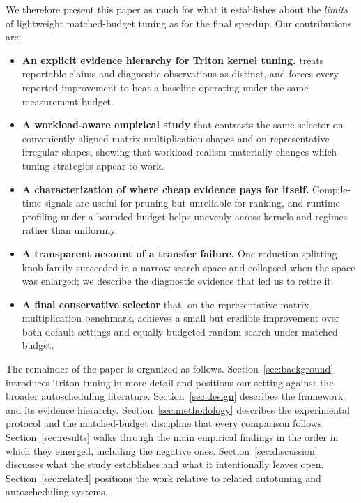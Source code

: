 We therefore present this paper as much for what it establishes about the \emph{limits} of lightweight matched-budget tuning as for the final speedup. Our contributions are:
\begin{itemize}
\item \textbf{An explicit evidence hierarchy for Triton kernel tuning.} \system treats reportable claims and diagnostic observations as distinct, and forces every reported improvement to beat a baseline operating under the same measurement budget.
\item \textbf{A workload-aware empirical study} that contrasts the same selector on conveniently aligned matrix multiplication shapes and on representative irregular shapes, showing that workload realism materially changes which tuning strategies appear to work.
\item \textbf{A characterization of where cheap evidence pays for itself.} Compile-time signals are useful for pruning but unreliable for ranking, and runtime profiling under a bounded budget helps unevenly across kernels and regimes rather than uniformly.
\item \textbf{A transparent account of a transfer failure.} One reduction-splitting knob family succeeded in a narrow search space and collapsed when the space was enlarged; we describe the diagnostic evidence that led us to retire it.
\item \textbf{A final conservative selector} that, on the representative matrix multiplication benchmark, achieves a small but credible improvement over both default settings and equally budgeted random search under matched budget.
\end{itemize}

The remainder of the paper is organized as follows. Section~\ref{sec:background} introduces Triton tuning in more detail and positions our setting against the broader autoscheduling literature. Section~\ref{sec:design} describes the \system framework and its evidence hierarchy. Section~\ref{sec:methodology} describes the experimental protocol and the matched-budget discipline that every comparison follows. Section~\ref{sec:results} walks through the main empirical findings in the order in which they emerged, including the negative ones. Section~\ref{sec:discussion} discusses what the study establishes and what it intentionally leaves open. Section~\ref{sec:related} positions the work relative to related autotuning and autoscheduling systems.
